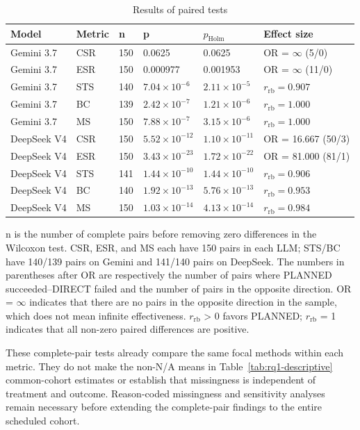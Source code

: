 \documentclass[pdflatex,sn-basic,Numbered,iicol]{sn-jnl}
\begin{document}
\begin{table}[htbp]
\caption{Results of paired tests}\label{tab:rq1-paired}
\centering
\scriptsize
\begin{tabular}{@{}llllll@{}}
\toprule
Model & Metric & n & p & $p_{\mathrm{Holm}}$ & Effect size \\
\midrule
Gemini 3.7 & CSR & 150 & 0.0625 & 0.0625 & OR = $\infty$ (5/0) \\
Gemini 3.7 & ESR & 150 & 0.000977 & 0.001953 & OR = $\infty$ (11/0) \\
Gemini 3.7 & STS & 140 & $7.04\times10^{-6}$ & $2.11\times10^{-5}$ & $r_{\mathrm{rb}}=0.907$ \\
Gemini 3.7 & BC & 139 & $2.42\times10^{-7}$ & $1.21\times10^{-6}$ & $r_{\mathrm{rb}}=1.000$ \\
Gemini 3.7 & MS & 150 & $7.88\times10^{-7}$ & $3.15\times10^{-6}$ & $r_{\mathrm{rb}}=1.000$ \\
DeepSeek V4 & CSR & 150 & $5.52\times10^{-12}$ & $1.10\times10^{-11}$ & OR = 16.667 (50/3) \\
DeepSeek V4 & ESR & 150 & $3.43\times10^{-23}$ & $1.72\times10^{-22}$ & OR = 81.000 (81/1) \\
DeepSeek V4 & STS & 141 & $1.44\times10^{-10}$ & $1.44\times10^{-10}$ & $r_{\mathrm{rb}}=0.906$ \\
DeepSeek V4 & BC & 140 & $1.92\times10^{-13}$ & $5.76\times10^{-13}$ & $r_{\mathrm{rb}}=0.953$ \\
DeepSeek V4 & MS & 150 & $1.03\times10^{-14}$ & $4.13\times10^{-14}$ & $r_{\mathrm{rb}}=0.984$ \\
\bottomrule
\end{tabular}
\end{table}

n is the number of complete pairs before removing zero differences in the Wilcoxon test. CSR, ESR, and MS each have 150 pairs in each LLM; STS/BC have 140/139 pairs on Gemini and 141/140 pairs on DeepSeek. The numbers in parentheses after OR are respectively the number of pairs where PLANNED succeeded--DIRECT failed and the number of pairs in the opposite direction. OR = \ensuremath{\infty} indicates that there are no pairs in the opposite direction in the sample, which does not mean infinite effectiveness. $r_{\mathrm{rb}}$ > 0 favors PLANNED; $r_{\mathrm{rb}}$ = 1 indicates that all non-zero paired differences are positive.

These complete-pair tests already compare the same focal methods within each metric. They do not make the non-N/A means in Table~\ref{tab:rq1-descriptive} common-cohort estimates or establish that missingness is independent of treatment and outcome. Reason-coded missingness and sensitivity analyses remain necessary before extending the complete-pair findings to the entire scheduled cohort.
\end{document}
